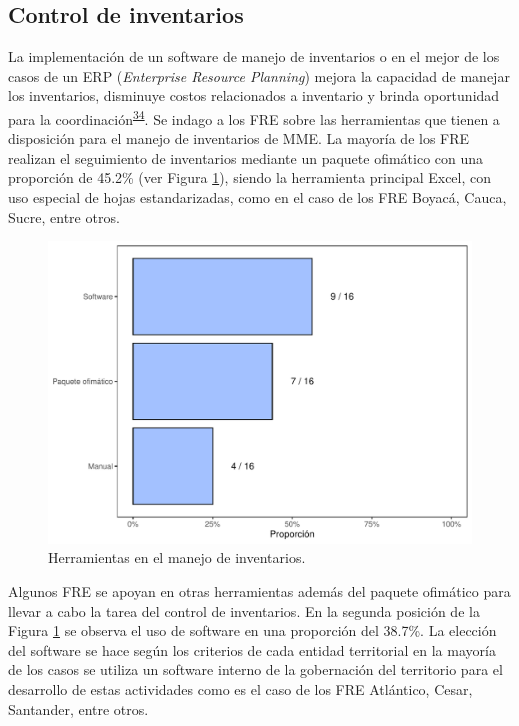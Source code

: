 \documentclass[
]{book}
\begin{document}
\hypertarget{control-de-inventarios}{%
\subsection{Control de inventarios}\label{control-de-inventarios}}

La implementación de un software de manejo de inventarios o en el mejor de los casos de un ERP (\emph{Enterprise Resource Planning}) mejora la capacidad de manejar los inventarios, disminuye costos relacionados a inventario y brinda oportunidad para la coordinación\textsuperscript{\protect\hyperlink{ref-Silver2017}{34}}. Se indago a los FRE sobre las herramientas que tienen a disposición para el manejo de inventarios de MME. La mayoría de los FRE realizan el seguimiento de inventarios mediante un paquete ofimático con una proporción de 45.2\% (ver Figura \ref{fig:HerramientasManejoInventarios}), siendo la herramienta principal Excel, con uso especial de hojas estandarizadas, como en el caso de los FRE Boyacá, Cauca, Sucre, entre otros.

\begin{figure}[t]

{\centering \includegraphics[width=0.95\linewidth]{InformeFinal_files/figure-latex/HerramientasManejoInventarios-1} 

}

\caption{Herramientas en el manejo de inventarios.}\label{fig:HerramientasManejoInventarios}
\end{figure}

Algunos FRE se apoyan en otras herramientas además del paquete ofimático para llevar a cabo la tarea del control de inventarios. En la segunda posición de la Figura \ref{fig:HerramientasManejoInventarios} se observa el uso de software en una proporción del 38.7\%. La elección del software se hace según los criterios de cada entidad territorial en la mayoría de los casos se utiliza un software interno de la gobernación del territorio para el desarrollo de estas actividades como es el caso de los FRE Atlántico, Cesar, Santander, entre otros.
\end{document}

